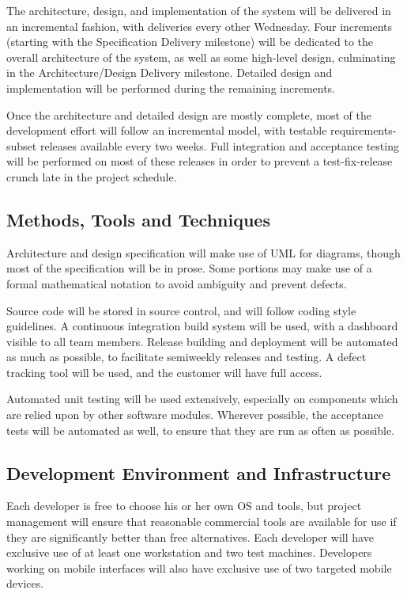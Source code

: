 \documentclass[11pt]{article}
\begin{document}
The architecture, design, and implementation of the system will be delivered in an incremental
fashion, with deliveries every other Wednesday.  Four increments (starting with the Specification
Delivery milestone) will be dedicated to the overall architecture of the system, as well as some
high-level design, culminating in the Architecture/Design Delivery milestone.  Detailed design and
implementation will be performed during the remaining increments.

Once the architecture and detailed design are mostly complete, most of the development effort will
follow an incremental model, with testable requirements-subset releases available every two weeks.
Full integration and acceptance testing will be performed on most of these releases in order to
prevent a test-fix-release crunch late in the project schedule.



\subsection{Methods, Tools and Techniques}
Architecture and design specification will make use of UML for diagrams, though most of the
specification will be in prose.  Some portions may make use of a formal mathematical notation to
avoid ambiguity and prevent defects.

Source code will be stored in source control, and will follow coding style guidelines.  A continuous
integration build system will be used, with a dashboard visible to all team members.  Release
building and deployment will be automated as much as possible, to facilitate semiweekly releases and
testing.  A defect tracking tool will be used, and the customer will have full access.

Automated unit testing will be used extensively, especially on components which are relied upon by
other software modules.  Wherever possible, the acceptance tests will be automated as well, to
ensure that they are run as often as possible.



\subsection{Development Environment and Infrastructure}
Each developer is free to choose his or her own OS and tools, but project management will ensure
that reasonable commercial tools are available for use if they are significantly better than free
alternatives.  Each developer will have exclusive use of at least one workstation and two test
machines.  Developers working on mobile interfaces will also have exclusive use of two targeted
mobile devices.
\end{document}
